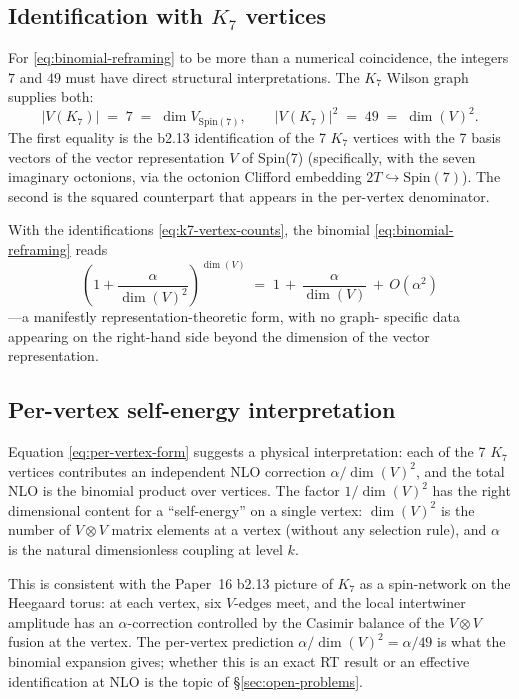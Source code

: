 \documentclass[11pt]{article}
\newcommand{\Spin}{\mathrm{Spin}}
\begin{document}
\subsection{Identification with $K_7$ vertices}

For \eqref{eq:binomial-reframing} to be more than a numerical
coincidence, the integers $7$ and $49$ must have direct structural
interpretations.  The $K_7$ Wilson graph supplies both:
\begin{equation}
  |V(K_7)| \;=\; 7 \;=\; \dim V_{\Spin(7)},
  \qquad
  |V(K_7)|^2 \;=\; 49 \;=\; \dim(V)^2.
  \label{eq:k7-vertex-counts}
\end{equation}
The first equality is the b2.13 identification of the 7 $K_7$
vertices with the 7 basis vectors of the vector representation
$V$ of Spin(7) (specifically, with the seven imaginary
octonions, via the octonion Clifford embedding
$2T \hookrightarrow \Spin(7)$).  The second is the squared
counterpart that appears in the per-vertex denominator.

With the identifications \eqref{eq:k7-vertex-counts}, the binomial
\eqref{eq:binomial-reframing} reads
\begin{equation}
  \left(1 + \frac{\alpha}{\dim(V)^2}\right)^{\!\dim(V)}
  \;=\; 1 \,+\, \frac{\alpha}{\dim(V)} \,+\, O(\alpha^2)
  \label{eq:per-vertex-form}
\end{equation}
---a manifestly representation-theoretic form, with no graph-
specific data appearing on the right-hand side beyond the dimension
of the vector representation.

\subsection{Per-vertex self-energy interpretation}

Equation \eqref{eq:per-vertex-form} suggests a physical
interpretation: each of the 7 $K_7$ vertices contributes an
independent NLO correction $\alpha/\dim(V)^2$, and the total NLO
is the binomial product over vertices.  The factor $1/\dim(V)^2$
has the right dimensional content for a ``self-energy'' on a
single vertex: $\dim(V)^2$ is the number of $V \otimes V$ matrix
elements at a vertex (without any selection rule), and $\alpha$
is the natural dimensionless coupling at level $k$.

This is consistent with the Paper~16 b2.13 picture of $K_7$ as a
spin-network on the Heegaard torus: at each vertex, six $V$-edges
meet, and the local intertwiner amplitude has an $\alpha$-correction
controlled by the Casimir balance of the $V \otimes V$ fusion at
the vertex.  The per-vertex prediction
$\alpha / \dim(V)^2 = \alpha/49$ is what the binomial expansion
gives; whether this is an exact RT result or an effective
identification at NLO is the topic of \S\ref{sec:open-problems}.
\end{document}
